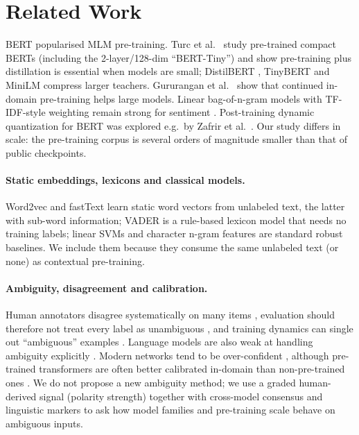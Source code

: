 \documentclass[11pt,a4paper]{article}
\begin{document}
\section{Related Work}
BERT \cite{devlin2019bert} popularised MLM pre-training. Turc et al.\ \cite{turc2019well} study pre-trained compact
BERTs (including the 2-layer/128-dim ``BERT-Tiny'') and show pre-training plus distillation is essential when models are
small; DistilBERT \cite{sanh2019distilbert}, TinyBERT \cite{jiao2020tinybert} and MiniLM \cite{wang2020minilm} compress larger
teachers. Gururangan et al.\ \cite{gururangan2020dont} show that continued in-domain pre-training helps
large models. Linear bag-of-n-gram models with TF-IDF-style weighting remain strong for sentiment \cite{wang2012baselines}.
Post-training dynamic quantization for BERT was explored e.g.\ by Zafrir et al.\ \cite{zafrir2019q8bert}. Our study
differs in scale: the pre-training corpus is several orders of magnitude smaller than that of public checkpoints.

\paragraph{Static embeddings, lexicons and classical models.} Word2vec \cite{mikolov2013efficient,mikolov2013distributed} and fastText \cite{bojanowski2017enriching} learn static word vectors from unlabeled text, the latter with sub-word information;
VADER \cite{hutto2014vader} is a rule-based lexicon model that needs no training labels; linear SVMs \cite{cortes1995support} and character n-gram features are standard robust baselines. We include them because they consume the same unlabeled text (or none) as contextual pre-training.

\paragraph{Ambiguity, disagreement and calibration.} Human annotators disagree systematically on many items \cite{pavlick2019inherent,nie2020can,plank2022problem}, evaluation should therefore not treat every label as unambiguous \cite{baan2022stop}, and
training dynamics can single out ``ambiguous'' examples \cite{swayamdipta2020dataset}. Language models are also weak at handling ambiguity explicitly \cite{liu2023afraid}. Modern networks tend to be over-confident \cite{guo2017calibration}, although pre-trained transformers are often better calibrated in-domain than non-pre-trained ones \cite{desai2020calibration}.
We do not propose a new ambiguity method; we use a graded human-derived signal (polarity strength) together with cross-model consensus and linguistic markers to ask how model families and pre-training scale behave on ambiguous inputs.
\end{document}

